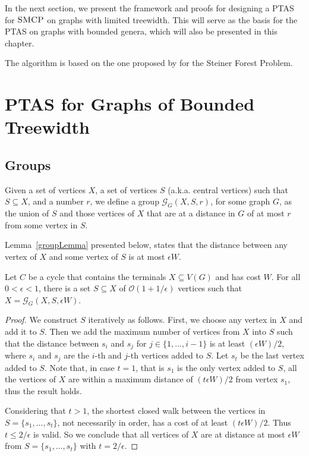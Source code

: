 In the next section, we present the framework and proofs for designing a PTAS for \(\textsc{SMCP}\) on graphs with limited treewidth. This will serve as the basis for the PTAS on graphs with bounded genera, which will also be presented in this chapter.

The algorithm is based on the one proposed by \cite{Bateni} for the Steiner Forest Problem.

\section{PTAS for Graphs of Bounded Treewidth}
\label{section:ptas_bounded_tree}

\subsection{Groups}

Given a set of vertices \(X\), a set of vertices \(S\) (a.k.a. central vertices) such that \(S \subseteq X\), and a number \(r\), we define a group \(\mathcal{G}_G(X, S, r)\), for some graph \(G\), as the union of \(S\) and those vertices of \(X\) that are at a distance in \(G\) of at most \(r\) from some vertex in \(S\).

Lemma~\ref{groupLemma} presented below, states that the distance between any vertex of \(X\) and some vertex of \(S\) is at most \(\epsilon W\).

\begin{flemma} \label{groupLemma}
Let \(C\) be a cycle that contains the terminals \(X \subseteq V(G)\) and has cost \(W\). For all \(0 < \epsilon < 1\), there is a set \(S \subseteq X\) of \(\mathcal{O}(1 + 1/\epsilon)\) vertices such that \(X = \mathcal{G}_G(X, S, \epsilon W)\).
\end{flemma}
\begin{proof}

We construct \(S\) iteratively as follows. 
First, we choose any vertex in \(X\) and add it to \(S\). Then we add the maximum number of vertices from \(X\) into \(S\) such that the distance between \(s_i\) and \(s_j\) for \(j \in \{1, \dots, i-1\}\) is at least \((\epsilon W)/2\), where $s_i$ and $s_j$ are the $i$-th and $j$-th vertices added to $S$. Let \(s_t\) be the last vertex added to \(S\). Note that, in case \(t = 1\), that is \(s_1\) is the only vertex added to \(S\), all the vertices of \(X\) are within a maximum distance of \((t \epsilon W)/2\) from vertex \(s_1\), thus the result holds.

Considering that \(t > 1\), the shortest closed walk between the vertices in \(S = \{s_1, \dots, s_t\}\), not necessarily in order, has a cost of at least \((t \epsilon W)/2\). Thus \(t \leq 2/\epsilon\) is valid. So we conclude that all vertices of \(X\) are at distance at most \(\epsilon W\) from \(S = \{s_1, \dots, s_t\}\) with \(t = 2/\epsilon\).
\end{proof}

